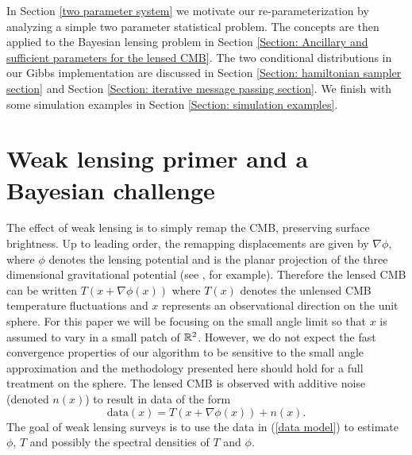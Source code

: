 \documentclass[iop,revtex4,apj,onecolumn]{emulateapj}
\begin{document}
In Section \ref{two parameter system} we motivate our re-parameterization by analyzing a simple two parameter statistical problem.  The concepts are then applied to the Bayesian lensing problem in Section \ref{Section: Ancillary and sufficient parameters for the lensed CMB}. The two conditional distributions in our Gibbs implementation are discussed in Section \ref{Section: hamiltonian sampler section} and Section \ref{Section: iterative message passing section}. We finish with some  simulation examples in Section \ref{Section: simulation examples}.




%
%
\section{Weak lensing primer and a Bayesian challenge}
\label{primer}

The effect of weak lensing is to simply remap the CMB, preserving surface brightness.   Up to leading order, the remapping  displacements are given by $\nabla \phi$, where $\phi$ denotes the lensing potential and is the planar projection of the three dimensional gravitational potential (see \cite{dodelson2003modern}, for example). Therefore the lensed CMB can  be written $T(x + \nabla \phi(x))$ where $T(x)$ denotes the unlensed CMB temperature fluctuations and $x$ represents an observational direction on the unit sphere. For this paper we will be focusing on the small angle limit  so that $x$ is assumed to vary in a small patch of $ \Bbb R^2$. However, we do not expect the fast convergence properties of our algorithm to be sensitive to the small angle approximation and the methodology presented here should hold for a full treatment on the sphere.  The lensed CMB is observed with additive noise (denoted $n(x)$) to result in data of the form
\begin{equation}
\label{data model}
 \text{data}(x)= T(x + \nabla \phi(x))+ n(x).
\end{equation}
The goal of weak lensing surveys is to use the data in (\ref{data model}) to  estimate $\phi$, $T$  and possibly  the spectral densities of $T$ and $\phi$.  
\end{document}
